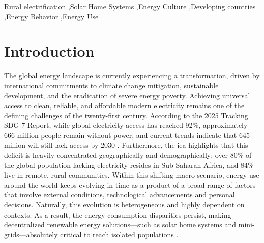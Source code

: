 \documentclass[final,3p,times,onecolumn]{elsarticle}
\begin{document}
\begin{frontmatter}


\begin{keyword}
Rural electrification \sep Solar Home Systems \sep Energy Culture \sep Developing countries \sep Energy Behavior \sep Energy Use

\end{keyword}

\end{frontmatter}


\section{Introduction}
\label{sec:introduction}

The global energy landscape is currently experiencing a transformation, driven by international commitments to climate change mitigation, sustainable development, and the eradication of severe energy poverty. Achieving universal access to clean, reliable, and affordable modern electricity remains one of the defining challenges of the twenty-first century. According to the 2025 Tracking SDG 7 Report, while global electricity access has reached 92\%, approximately 666 million people remain without power, and current trends indicate that 645 million will still lack access by 2030 \cite{iea_irena_unsd_wb_who_tracking_2023}. Furthermore, the \gls{iea} highlights that this deficit is heavily concentrated geographically and demographically: over 80\% of the global population lacking electricity resides in Sub-Saharan Africa, and 84\% live in remote, rural communities. Within this shifting macro-scenario, energy use around the world keeps evolving in time as a product of a broad range of factors that involve external conditions, technological advancements and personal decisions. Naturally, this evolution is heterogeneous and highly dependent on contexts. As a result, the energy consumption disparities persist, making decentralized renewable energy solutions—such as solar home systems and mini-grids—absolutely critical to reach isolated populations \cite{add cite}.
\end{document}
